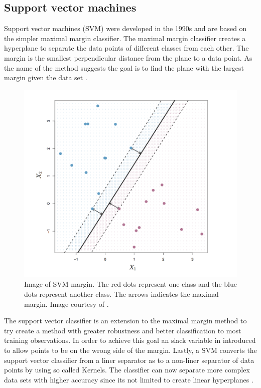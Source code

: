 \subsection{Support vector machines}

Support vector machines (SVM) were developed in the 1990s and are based on the simpler maximal margin classifier. The maximal margin classifier creates a hyperplane to separate the data points of different classes from each other. The margin is the smallest perpendicular distance from the plane to a data point. As the name of the method suggests the goal is to find the plane with the largest margin given the data set \parencite{James:2014}.

\begin{figure}[ht!]
  \centering
  \includegraphics[width=0.7\linewidth]{images/Margin_SVM.png}
  \caption[]
  {\small Image of SVM margin. The red dots represent one class and the blue dots represent another class. The arrows indicates the maximal margin. Image courtesy of \textcite{James:2014}.}
  \label{fig:SVM_Margin}
\end{figure}

The support vector classifier is an extension to the maximal margin method to try create a method with greater robustness and better classification to most training observations. In order to achieve this goal an slack variable in introduced to allow points to be on the wrong side of the margin. Lastly, a SVM converts the support vector classifier from a liner separator as to  a non-liner separator of data points by using so called Kernels. The classifier can now separate more complex data sets with higher accuracy since its not limited to create linear hyperplanes \parencite{James:2014}.


